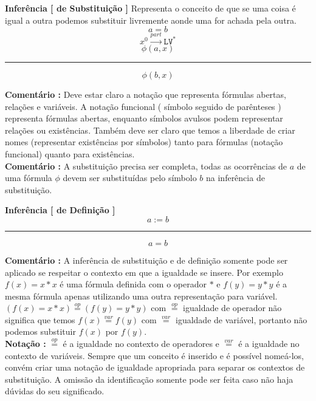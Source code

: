 \documentclass[10pt,a4paper]{report}
\begin{document}
\textbf{Inferência [ de Substituição ]} Representa o conceito de que se uma coisa é igual a outra podemos substituir livremente aonde uma for achada pela outra.
$$ a = b $$
$$ x^0 \overset{part}{\rightarrow} \texttt{LV}^* $$
$$  \phi(a,x) $$
\hrule
$$ \phi(b,x) $$

\textbf{Comentário :} Deve estar claro a notação que representa fórmulas abertas, relações e variáveis. A notação funcional ( símbolo seguido de parênteses ) representa fórmulas abertas, enquanto símbolos avulsos podem representar relações ou existências. Também deve ser claro que temos a liberdade de criar nomes (representar existências por símbolos) tanto para fórmulas (notação funcional) quanto para existências.\\

\textbf{Comentário :} A substituição precisa ser completa, todas as ocorrências de $a$ de uma fórmula $\phi$ devem ser substituídas pelo símbolo $b$ na inferência de substituição.\\



\hspace{\baselineskip}

\textbf{Inferência [ de Definição ]}
$$ a:=b $$
\hrule
$$ a=b $$

\textbf{Comentário :} A inferência de substituição e de definição somente pode ser aplicado se respeitar o contexto em que a igualdade se insere. Por exemplo $ f(x) = x*x $ é uma fórmula definida com o operador $*$ e $f(y)=y*y$ é a mesma fórmula apenas utilizando uma outra representação para variável. $ (f(x) = x*x) \overset{op}{=} (f(y) = y*y)$ com $\overset{op}{=}$ igualdade de operador não significa que temos $f(x) \overset{var}{=} f(y)$ com $\overset{var}{=}$ igualdade de variável, portanto não podemos substituir $f(x)$ por $f(y)$.\\

\textbf{Notação :} $ \overset{op}{=} $ é a igualdade no contexto de operadores e $\overset{var}{=}$ é a igualdade no contexto de variáveis. Sempre que um conceito é inserido e é possível nomeá-los, convém criar uma notação de igualdade apropriada para separar os contextos de substituição. A omissão da identificação somente pode ser feita caso não haja dúvidas do seu significado.

\end{document}
